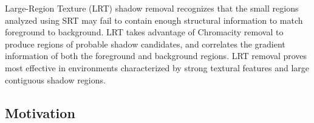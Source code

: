 \documentclass[12pt]{report}
\begin{document}
Large-Region Texture (LRT) shadow removal recognizes that the small regions analyzed using SRT may fail to contain enough structural information to match foreground to background. LRT takes advantage of Chromacity removal to produce regions of probable shadow candidates, and correlates the gradient information of both the foreground and background regions. LRT removal proves most effective in environments characterized by strong textural features and large contiguous shadow regions.


\subsection{Motivation}

\end{document}
